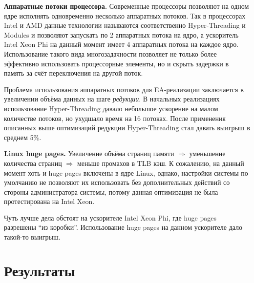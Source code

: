 \documentclass[a4paper,10pt]{extarticle}
\begin{document}
\textbf{Аппаратные потоки процессора.}
Современные процессоры позволяют на одном ядре исполнять одновременно несколько аппаратных потоков. Так в процессорах Intel и AMD данные технологии называются соответственно Hyper-Threading и Modules и позволяют запускать по 2 аппаратных потока на ядро, а ускоритель Intel Xeon Phi на данный момент имеет 4 аппаратных потока на каждое ядро. Использование такого вида многозадачности позволяет не только более эффективно использовать процессорные элементы, но и скрыть задержки в память за счёт переключения на другой поток.

Проблема использования аппаратных потоков для EA-реализации заключается в увеличении объёма данных на шаге \textit{редукции}. В начальных реализациях использование Hyper-Threading давало небольшое
ускорение на малом количестве потоков, но ухудшало время на 16 потоках. После применения описанных выше оптимизаций редукции Hyper-Threading стал давать выигрыш в среднем 5\%.



\textbf{Linux huge pages.}
Увеличение объёма страниц памяти $\Rightarrow$ уменьшение количества страниц $\Rightarrow$ меньше промахов в TLB кэш.
К сожалению, на данный момент хоть и huge pages включены в ядре Linux, однако, настройки системы по умолчанию не позволяют их использовать без дополнительных действий со стороны администратора системы, потому данная оптимизация не была протестирована на Intel Xeon.

Чуть лучше дела обстоят на ускорителе Intel Xeon Phi, где huge pages разрешены ``из коробки''. Использование huge pages на данном ускорителе дало такой-то выигрыш.

\section{Результаты}
\label{sec:results}
\end{document}
